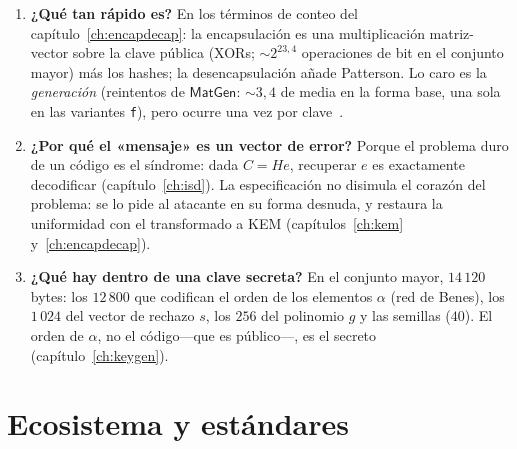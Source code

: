\documentclass[11pt,a4paper,oneside]{report}
\begin{document}
\begin{enumerate}[leftmargin=1.9em,itemsep=5pt]
  \item \textbf{¿Qué tan rápido es?} En los términos de conteo del
        capítulo~\ref{ch:encapdecap}: la encapsulación es una
        multiplicación matriz-vector sobre la clave pública
        (XORs; $\sim2^{23{,}4}$ operaciones de bit en el conjunto
        mayor) más los hashes; la desencapsulación añade Patterson.
        Lo caro es la \emph{generación} (reintentos de
        $\textsf{MatGen}$: $\sim3{,}4$ de media en la forma base,
        una sola en las variantes \texttt{f}), pero ocurre una vez
        por clave~\cite{cmrationale}.

  \item \textbf{¿Por qué el «mensaje» es un vector de error?} Porque
        el problema duro de un código es el síndrome: dada
        $C=He$, recuperar $e$ es exactamente
        decodificar (capítulo~\ref{ch:isd}). La especificación no
        disimula el corazón del problema: se lo pide al atacante en
        su forma desnuda, y restaura la uniformidad con el
        transformado a KEM (capítulos~\ref{ch:kem}
        y~\ref{ch:encapdecap}).

  \item \textbf{¿Qué hay dentro de una clave secreta?} En el
        conjunto mayor, $14\,120$ bytes: los $12\,800$ que codifican
        el orden de los elementos $\alpha$ (red de Benes), los
        $1\,024$ del vector de rechazo $s$, los $256$ del polinomio
        $g$ y las semillas ($40$). El orden de $\alpha$, no el
        código---que es público---, es el secreto
        (capítulo~\ref{ch:keygen}).
\end{enumerate}

\section{Ecosistema y estándares}
\end{document}
